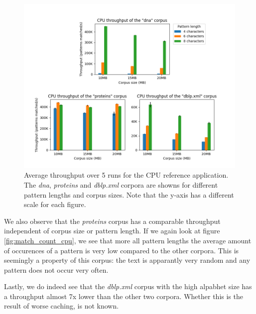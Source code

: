 \begin{figure}[H]
\centering
\includegraphics[width=1.0\textwidth]{figures/throughput_cpu.png}
\caption{Average throughput over 5 runs for the CPU reference application. The \textit{dna}, \textit{proteins} and \textit{dblp.xml} corpora are showns for different pattern lengths and corpus sizes. Note that the y-axis has a different scale for each figure.}
\label{fig:throughput_cpu}
\end{figure}

We also observe that the \textit{proteins} corpus has a comparable throughput independent of corpus size or pattern length.
If we again look at figure \ref{fig:match_count_cpu}, we see that more all pattern lengths the average amount of occurences of a pattern is very low compared to the other corpora.
This is seemingly a property of this corpus: the text is apparantly very random and any pattern does not occur very often.

Lastly, we do indeed see that the \textit{dblp.xml} corpus with the high alpabhet size has a throughput almost 7x lower than the other two corpora.
Whether this is the result of worse caching, is not known.

